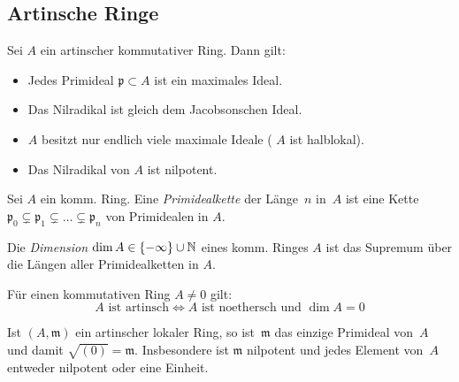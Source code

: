 \documentclass{cheat-sheet}
\newcommand{\ppp}{\mathfrak{p}}
\newcommand{\mmm}{\mathfrak{m}}
\begin{document}
\subsection{Artinsche Ringe}



\begin{prop}
  Sei $A$ ein artinscher kommutativer Ring.
  Dann gilt:
  \begin{itemize}
    \item Jedes Primideal $\ppp \subset A$ ist ein maximales Ideal.
    \item Das Nilradikal ist gleich dem Jacobsonschen Ideal.
    \item $A$ besitzt nur endlich viele maximale Ideale (\dh{} $A$ ist halblokal).
    \item Das Nilradikal von $A$ ist nilpotent.
  \end{itemize}
\end{prop}


\begin{defn}
  Sei $A$ ein komm. Ring.
  Eine \emph{Primidealkette} der Länge~$n$ in~$A$ ist eine Kette $\ppp_0 \subsetneq \ppp_1 \subsetneq \ldots \subsetneq \ppp_n$ von Primidealen in $A$.
\end{defn}

\begin{defn}
  Die \emph{Dimension} $\dim A \in \{ - \infty \} \cup \mathbb{N}$ eines komm. Ringes $A$ ist das Supremum über die Längen aller Primidealketten in $A$.
\end{defn}

\begin{bspe}
   \quad
   \quad
\end{bspe}

\begin{satz}
  Für einen kommutativen Ring $A \neq 0$ gilt:
  \[
    \text{$A$ ist artinsch} \iff \text{$A$ ist noethersch und $\dim A = 0$}
  \]
\end{satz}

\begin{bem}
  Ist $(A, \mmm)$ ein artinscher lokaler Ring, so ist~$\mmm$ das einzige Primideal von~$A$ und damit $\sqrt{(0)} = \mmm$.
  Insbesondere ist $\mmm$ nilpotent und jedes Element von~$A$ entweder nilpotent oder eine Einheit.
\end{bem}
\end{document}
